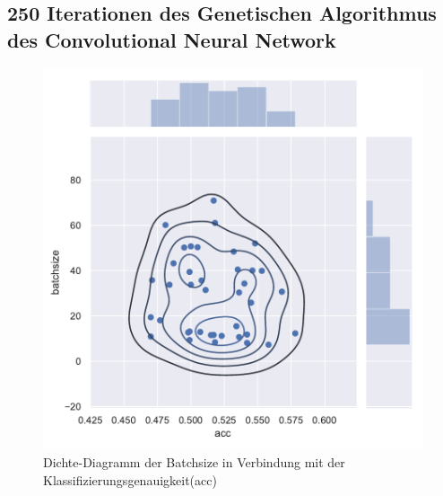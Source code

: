 \subsection{250 Iterationen des Genetischen Algorithmus des Convolutional Neural Network}
\begin{figure}[H]
  \centering  
  \includegraphics[scale=0.5]{anhang/GA_250_cifar10_True_big_jointplot_batchsize.pdf}
  \caption{Dichte-Diagramm der Batchsize in Verbindung mit der Klassifizierungsgenauigkeit(acc)}
  
\end{figure}

